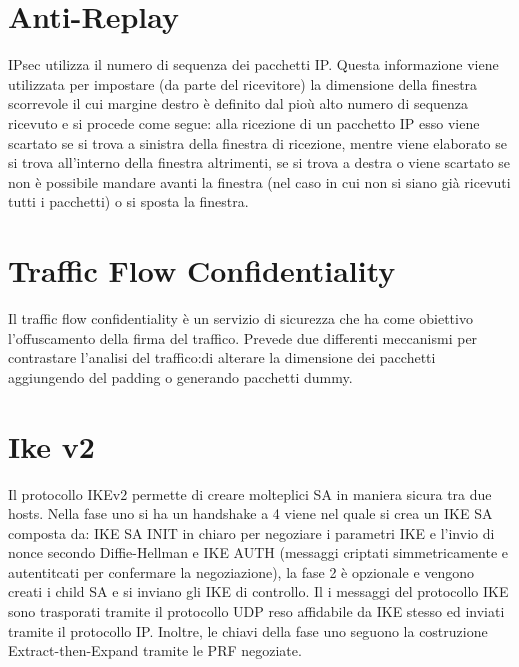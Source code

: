 \documentclass{article}
\begin{document}
\section{Anti-Replay}
IPsec utilizza il numero di sequenza dei pacchetti IP\@. Questa informazione viene utilizzata per impostare (da parte del ricevitore) la dimensione della finestra scorrevole il cui margine destro è definito dal pioù alto numero di sequenza ricevuto e si procede come segue: alla ricezione di un pacchetto IP esso viene scartato se si trova a sinistra della finestra di ricezione, mentre viene elaborato se si trova all'interno della finestra altrimenti, se si trova a destra o viene scartato se non è possibile mandare avanti la finestra (nel caso in cui non si siano già ricevuti tutti i pacchetti) o si sposta la finestra\@.
\section{Traffic Flow Confidentiality}
Il traffic flow confidentiality è un servizio di sicurezza che ha come obiettivo l'offuscamento della firma del traffico\@. Prevede due differenti meccanismi per contrastare l'analisi del traffico: di alterare la dimensione dei pacchetti aggiungendo del padding o generando pacchetti dummy\@.
\section{Ike v2}
Il protocollo IKEv2 permette di creare molteplici SA in maniera sicura tra due hosts\@. Nella fase uno si ha un handshake a 4 viene nel quale si crea un IKE SA composta da: IKE SA INIT in chiaro per negoziare i parametri IKE e l'invio di nonce secondo Diffie-Hellman e IKE AUTH (messaggi criptati simmetricamente e autentitcati per confermare la negoziazione), la fase 2 è opzionale e vengono creati i child SA e si inviano gli IKE di controllo\@.\newline
Il i messaggi del protocollo IKE sono trasporati tramite il protocollo UDP reso affidabile da IKE stesso ed inviati tramite il protocollo IP\@. \newline
Inoltre, le chiavi della fase uno seguono la costruzione Extract-then-Expand tramite le PRF negoziate.
\end{document}
